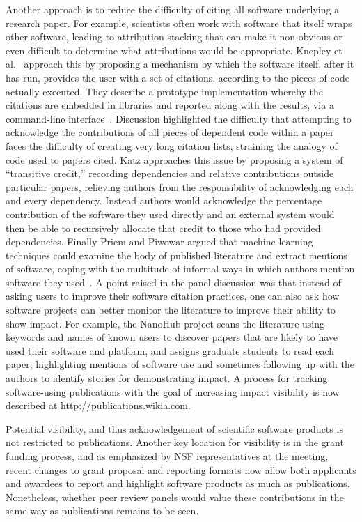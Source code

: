 \documentclass[11pt, oneside]{amsart}
\begin{document}
Another approach is to reduce the difficulty of citing all software
underlying a research paper. For example, scientists often work with
software that itself wraps other software, leading to attribution
stacking that can make it non-obvious or even difficult to determine
what attributions would be appropriate. Knepley et al.~\cite{Knepley_WSSSPE} approach this by
proposing a mechanism by which the software itself, after it has run,
provides the user with a set of citations, according to the pieces of
code actually executed. They describe a prototype implementation whereby
the citations are embedded in libraries and reported along with the
results, via a command-line interface~\cite{Knepley_WSSSPE}. Discussion
highlighted the difficulty that attempting to acknowledge the
contributions of all pieces of dependent code within a paper faces the
difficulty of creating very long citation lists, straining the analogy
of code used to papers cited. Katz approaches this issue by proposing
a system of ``transitive credit,'' recording dependencies and relative
contributions outside particular papers, relieving authors from the
responsibility of acknowledging each and every dependency. Instead
authors would acknowledge the percentage contribution of the software
they used directly and an external system would then be able to
recursively allocate that credit to those who had provided
dependencies. Finally Priem and Piwowar argued that machine learning
techniques could examine the body of published literature and extract
mentions of software, coping with the multitude of informal ways in
which authors mention software they used~\cite{Priem_WSSSPE}.
A point raised in the panel discussion was that instead of asking users to improve
their software citation practices, one can also ask how software
projects can better monitor the literature to improve their
ability to show impact. For example, the NanoHub project scans the literature using keywords and names
of known users to discover papers that are likely to have used their
software and platform, and assigns graduate students to read each paper,
highlighting mentions of software use and sometimes following up with the authors to
identify stories for demonstrating impact.  A process for tracking
software-using publications with the goal of increasing impact visibility is now described at \url{http://publications.wikia.com}.

Potential visibility, and thus acknowledgement of scientific software
products is not restricted to publications. Another key location for
visibility is in the grant funding
process, and as emphasized by NSF representatives at the meeting,
recent changes to grant proposal and reporting formats now allow both
applicants and awardees to report and highlight software products as
much as publications. Nonetheless, whether peer review
panels would value these contributions in the same way as
publications remains to be seen.
\end{document}
